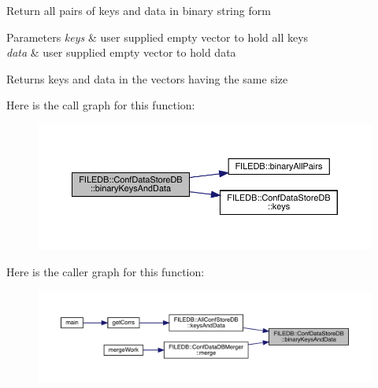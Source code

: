 Return all pairs of keys and data in binary string form 
\begin{DoxyParams}{Parameters}
{\em keys} & user supplied empty vector to hold all keys \\
\hline
{\em data} & user supplied empty vector to hold data \\
\hline
\end{DoxyParams}
\begin{DoxyReturn}{Returns}
keys and data in the vectors having the same size 
\end{DoxyReturn}
Here is the call graph for this function\+:
\nopagebreak
\begin{figure}[H]
\begin{center}
\leavevmode
\includegraphics[width=350pt]{d8/d19/classFILEDB_1_1ConfDataStoreDB_ae38beaf9ba3f8629f2c322a3c5a23357_cgraph}
\end{center}
\end{figure}
Here is the caller graph for this function\+:
\nopagebreak
\begin{figure}[H]
\begin{center}
\leavevmode
\includegraphics[width=350pt]{d8/d19/classFILEDB_1_1ConfDataStoreDB_ae38beaf9ba3f8629f2c322a3c5a23357_icgraph}
\end{center}
\end{figure}
\mbox{\label{classFILEDB_1_1ConfDataStoreDB_ae38beaf9ba3f8629f2c322a3c5a23357}} 
